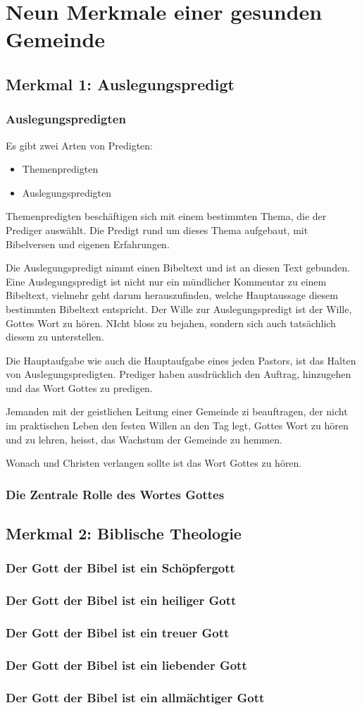 \documentclass{../../inc/mybib}
\begin{document}
\section*{Neun Merkmale einer gesunden Gemeinde}
\subsection*{Merkmal 1: Auslegungspredigt}
\subsubsection*{Auslegungspredigten}
Es gibt zwei Arten von Predigten:
\begin{itemize}
    \item Themenpredigten
    \item Auslegungspredigten
\end{itemize}
Themenpredigten beschäftigen sich mit einem bestimmten Thema, die der Prediger auswählt. Die Predigt rund um dieses Thema aufgebaut, mit Bibelversen und eigenen Erfahrungen.

Die Auslegungspredigt nimmt einen Bibeltext und ist an diesen Text gebunden. Eine Auslegungspredigt ist nicht nur ein mündlicher Kommentar zu einem Bibeltext, vielmehr geht darum herauszufinden, welche Hauptaussage diesem bestimmten Bibeltext entspricht. Der Wille zur Auslegungspredigt ist der Wille, Gottes Wort zu hören. NIcht bloss zu bejahen, sondern sich auch tatsächlich diesem zu unterstellen.

Die Hauptaufgabe wie auch die Hauptaufgabe eines jeden Pastors, ist das Halten von Auslegungspredigten. Prediger haben ausdrücklich den Auftrag, hinzugehen und das Wort Gottes zu predigen.

Jemanden mit der geistlichen Leitung einer Gemeinde zi beauftragen, der nicht im praktischen Leben den festen Willen an den Tag legt, Gottes Wort zu hören und zu lehren, heisst, das Wachstum der Gemeinde zu hemmen.

Wonach und Christen verlangen sollte ist das Wort Gottes zu hören.

\subsubsection*{Die Zentrale Rolle des Wortes Gottes}
\subsection*{Merkmal 2: Biblische Theologie}
\subsubsection*{Der Gott der Bibel ist ein Schöpfergott}
\subsubsection*{Der Gott der Bibel ist ein heiliger Gott}
\subsubsection*{Der Gott der Bibel ist ein treuer Gott}
\subsubsection*{Der Gott der Bibel ist ein liebender Gott}
\subsubsection*{Der Gott der Bibel ist ein allmächtiger Gott}
\end{document}
